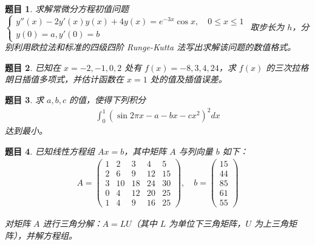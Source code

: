\documentclass[12pt,a4paper]{article}
\newtheorem{problem}{题目}
\newcommand{\largeanswer}{\newpage\vspace*{0.5cm}\vspace{0.5cm}}
\begin{document}
    \largeanswer
    
    \begin{problem}
        求解常微分方程初值问题 
        $\begin{cases}
            y''(x) - 2y'(x)y(x) + 4y(x) = e^{-3x} \cos x, \quad 0 \leq x \leq 1 \\
            y(0) = a, y'(0) = b
        \end{cases}$
        取步长为 $h$，分别利用欧拉法和标准的四级四阶 Runge-Kutta 法写出求解该问题的数值格式。
    \end{problem}
    
    \largeanswer
    
    \begin{problem}
        已知在 $x = -2, -1, 0, 2$ 处有 $f(x) = -8, 3, 4, 24$，求 $f(x)$ 的三次拉格朗日插值多项式，并估计函数在 $x = 1$ 处的值及插值误差。
    \end{problem}
    
    \largeanswer
    
    \begin{problem}
        求 $a, b, c$ 的值，使得下列积分
        \begin{align*}
            \int_0^1 (\sin 2\pi x - a - bx - cx^2)^2 dx
        \end{align*}
        达到最小。
    \end{problem}
    
    \largeanswer
    
    \begin{problem}
        已知线性方程组 $Ax = b$，其中矩阵 $A$ 与列向量 $b$ 如下：
        \begin{align*}
            A = \begin{pmatrix} 1 & 2 & 3 & 4 & 5 \\ 2 & 6 & 9 & 12 & 15 \\ 3 & 10 & 18 & 24 & 30 \\ 0 & 4 & 12 & 20 & 25 \\ 1 & 4 & 9 & 16 & 25 \end{pmatrix}, \quad b = \begin{pmatrix} 15 \\ 44 \\ 85 \\ 61 \\ 55 \end{pmatrix}
        \end{align*}
        
        对矩阵 $A$ 进行三角分解：$A = LU$（其中 $L$ 为单位下三角矩阵，$U$ 为上三角矩阵），并解方程组。
    \end{problem}
    
\end{document}
